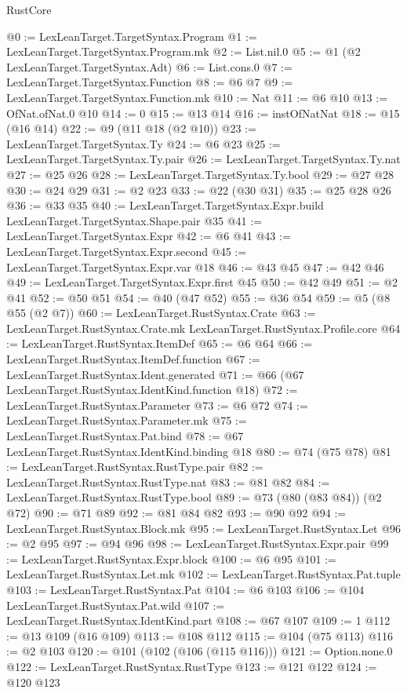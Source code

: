 \begin{lexlean}{RustCore}
\begin{coremodule}
{\begin{coremodule}
{{{{{@0 := LexLeanTarget.TargetSyntax.Program
@1 := LexLeanTarget.TargetSyntax.Program.mk
@2 := List.nil.{0}
@5 := @1 (@2 LexLeanTarget.TargetSyntax.Adt)
@6 := List.cons.{0}
@7 := LexLeanTarget.TargetSyntax.Function
@8 := @6 @7
@9 := LexLeanTarget.TargetSyntax.Function.mk
@10 := Nat
@11 := @6 @10
@13 := OfNat.ofNat.{0} @10
@14 := 0
@15 := @13 @14
@16 := instOfNatNat
@18 := @15 (@16 @14)
@22 := @9 (@11 @18 (@2 @10))
@23 := LexLeanTarget.TargetSyntax.Ty
@24 := @6 @23
@25 := LexLeanTarget.TargetSyntax.Ty.pair
@26 := LexLeanTarget.TargetSyntax.Ty.nat
@27 := @25 @26
@28 := LexLeanTarget.TargetSyntax.Ty.bool
@29 := @27 @28
@30 := @24 @29
@31 := @2 @23
@33 := @22 (@30 @31)
@35 := @25 @28 @26
@36 := @33 @35
@40 := LexLeanTarget.TargetSyntax.Expr.build LexLeanTarget.TargetSyntax.Shape.pair @35
@41 := LexLeanTarget.TargetSyntax.Expr
@42 := @6 @41
@43 := LexLeanTarget.TargetSyntax.Expr.second
@45 := LexLeanTarget.TargetSyntax.Expr.var @18
@46 := @43 @45
@47 := @42 @46
@49 := LexLeanTarget.TargetSyntax.Expr.first @45
@50 := @42 @49
@51 := @2 @41
@52 := @50 @51
@54 := @40 (@47 @52)
@55 := @36 @54
@59 := @5 (@8 @55 (@2 @7))
@60 := LexLeanTarget.RustSyntax.Crate
@63 := LexLeanTarget.RustSyntax.Crate.mk LexLeanTarget.RustSyntax.Profile.core
@64 := LexLeanTarget.RustSyntax.ItemDef
@65 := @6 @64
@66 := LexLeanTarget.RustSyntax.ItemDef.function
@67 := LexLeanTarget.RustSyntax.Ident.generated
@71 := @66 (@67 LexLeanTarget.RustSyntax.IdentKind.function @18)
@72 := LexLeanTarget.RustSyntax.Parameter
@73 := @6 @72
@74 := LexLeanTarget.RustSyntax.Parameter.mk
@75 := LexLeanTarget.RustSyntax.Pat.bind
@78 := @67 LexLeanTarget.RustSyntax.IdentKind.binding @18
@80 := @74 (@75 @78)
@81 := LexLeanTarget.RustSyntax.RustType.pair
@82 := LexLeanTarget.RustSyntax.RustType.nat
@83 := @81 @82
@84 := LexLeanTarget.RustSyntax.RustType.bool
@89 := @73 (@80 (@83 @84)) (@2 @72)
@90 := @71 @89
@92 := @81 @84 @82
@93 := @90 @92
@94 := LexLeanTarget.RustSyntax.Block.mk
@95 := LexLeanTarget.RustSyntax.Let
@96 := @2 @95
@97 := @94 @96
@98 := LexLeanTarget.RustSyntax.Expr.pair
@99 := LexLeanTarget.RustSyntax.Expr.block
@100 := @6 @95
@101 := LexLeanTarget.RustSyntax.Let.mk
@102 := LexLeanTarget.RustSyntax.Pat.tuple
@103 := LexLeanTarget.RustSyntax.Pat
@104 := @6 @103
@106 := @104 LexLeanTarget.RustSyntax.Pat.wild
@107 := LexLeanTarget.RustSyntax.IdentKind.part
@108 := @67 @107
@109 := 1
@112 := @13 @109 (@16 @109)
@113 := @108 @112
@115 := @104 (@75 @113)
@116 := @2 @103
@120 := @101 (@102 (@106 (@115 @116)))
@121 := Option.none.{0}
@122 := LexLeanTarget.RustSyntax.RustType
@123 := @121 @122
@124 := @120 @123
}}}}}
\end{coremodule}}
\end{coremodule}
\end{lexlean}
